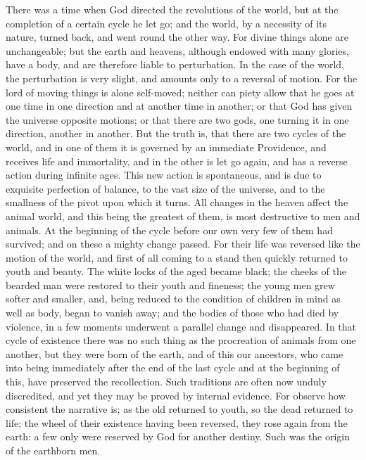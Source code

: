 \documentclass[11pt,letter]{article}
\begin{document}
\par  There was a time when God directed the revolutions of the world, but at the completion of a certain cycle he let go; and the world, by a necessity of its nature, turned back, and went round the other way. For divine things alone are unchangeable; but the earth and heavens, although endowed with many glories, have a body, and are therefore liable to perturbation. In the case of the world, the perturbation is very slight, and amounts only to a reversal of motion. For the lord of moving things is alone self-moved; neither can piety allow that he goes at one time in one direction and at another time in another; or that God has given the universe opposite motions; or that there are two gods, one turning it in one direction, another in another. But the truth is, that there are two cycles of the world, and in one of them it is governed by an immediate Providence, and receives life and immortality, and in the other is let go again, and has a reverse action during infinite ages. This new action is spontaneous, and is due to exquisite perfection of balance, to the vast size of the universe, and to the smallness of the pivot upon which it turns. All changes in the heaven affect the animal world, and this being the greatest of them, is most destructive to men and animals. At the beginning of the cycle before our own very few of them had survived; and on these a mighty change passed. For their life was reversed like the motion of the world, and first of all coming to a stand then quickly returned to youth and beauty. The white locks of the aged became black; the cheeks of the bearded man were restored to their youth and fineness; the young men grew softer and smaller, and, being reduced to the condition of children in mind as well as body, began to vanish away; and the bodies of those who had died by violence, in a few moments underwent a parallel change and disappeared. In that cycle of existence there was no such thing as the procreation of animals from one another, but they were born of the earth, and of this our ancestors, who came into being immediately after the end of the last cycle and at the beginning of this, have preserved the recollection. Such traditions are often now unduly discredited, and yet they may be proved by internal evidence. For observe how consistent the narrative is; as the old returned to youth, so the dead returned to life; the wheel of their existence having been reversed, they rose again from the earth: a few only were reserved by God for another destiny. Such was the origin of the earthborn men.
\end{document}
